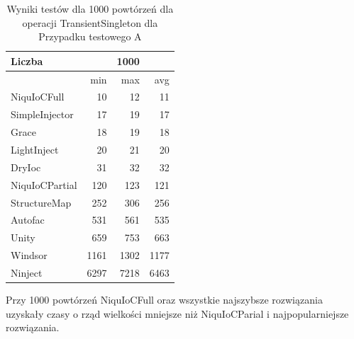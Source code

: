 \documentclass[12pt]{article}
\begin{document}
\begin{table}[H]
\captionsetup{belowskip=0pt,aboveskip=0pt}
\begin{center}
\begin{small}
	\begin{tabular}{ | l | r r r | }
    		\hline
Liczba & & 1000 & \\ \hline
 & min & max & avg \\ \hline
NiquIoCFull & 10 & 12 & 11 \\ \hline
SimpleInjector & 17 & 19 & 17 \\ \hline
Grace & 18 & 19 & 18 \\ \hline
LightInject & 20 & 21 & 20 \\ \hline
DryIoc & 31 & 32 & 32 \\ \hline
NiquIoCPartial & 120 & 123 & 121 \\ \hline
StructureMap & 252 & 306 & 256 \\ \hline
Autofac & 531 & 561 & 535 \\ \hline
Unity & 659 & 753 & 663 \\ \hline
Windsor & 1161 & 1302 & 1177 \\ \hline
Ninject & 6297 & 7218 & 6463 \\ \hline
  	\end{tabular}
\end{small}
\end{center}
\caption{Wyniki testów dla 1000 powtórzeń dla operacji TransientSingleton dla Przypadku testowego A}
\label{TestCaseA_TransientSingleton1000}
\end{table}
Przy 1000 powtórzeń NiquIoCFull oraz wszystkie najszybsze rozwiązania uzyskały czasy o rząd wielkości mniejsze niż NiquIoCParial i najpopularniejsze rozwiązania.
\end{document}
